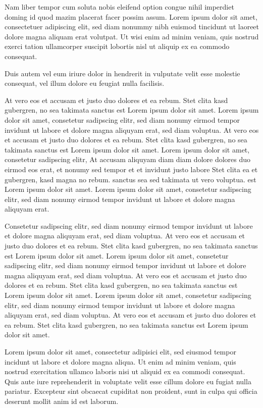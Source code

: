 \documentclass[twoside,a4paper]{article}
\begin{document}
Nam liber tempor cum soluta nobis eleifend option congue nihil imperdiet doming id quod mazim placerat facer possim assum. Lorem ipsum dolor sit amet, consectetuer adipiscing elit, sed diam nonummy nibh euismod tincidunt ut laoreet dolore magna aliquam erat volutpat. Ut wisi enim ad minim veniam, quis nostrud exerci tation ullamcorper suscipit lobortis nisl ut aliquip ex ea commodo consequat.

Duis autem vel eum iriure dolor in hendrerit in vulputate velit esse molestie consequat, vel illum dolore eu feugiat nulla facilisis.

At vero eos et accusam et justo duo dolores et ea rebum. Stet clita kasd gubergren, no sea takimata sanctus est Lorem ipsum dolor sit amet. Lorem ipsum dolor sit amet, consetetur sadipscing elitr, sed diam nonumy eirmod tempor invidunt ut labore et dolore magna aliquyam erat, sed diam voluptua. At vero eos et accusam et justo duo dolores et ea rebum. Stet clita kasd gubergren, no sea takimata sanctus est Lorem ipsum dolor sit amet. Lorem ipsum dolor sit amet, consetetur sadipscing elitr, At accusam aliquyam diam diam dolore dolores duo eirmod eos erat, et nonumy sed tempor et et invidunt justo labore Stet clita ea et gubergren, kasd magna no rebum. sanctus sea sed takimata ut vero voluptua. est Lorem ipsum dolor sit amet. Lorem ipsum dolor sit amet, consetetur sadipscing elitr, sed diam nonumy eirmod tempor invidunt ut labore et dolore magna aliquyam erat.

Consetetur sadipscing elitr, sed diam nonumy eirmod tempor invidunt ut labore et dolore magna aliquyam erat, sed diam voluptua. At vero eos et accusam et justo duo dolores et ea rebum. Stet clita kasd gubergren, no sea takimata sanctus est Lorem ipsum dolor sit amet. Lorem ipsum dolor sit amet, consetetur sadipscing elitr, sed diam nonumy eirmod tempor invidunt ut labore et dolore magna aliquyam erat, sed diam voluptua. At vero eos et accusam et justo duo dolores et ea rebum. Stet clita kasd gubergren, no sea takimata sanctus est Lorem ipsum dolor sit amet. Lorem ipsum dolor sit amet, consetetur sadipscing elitr, sed diam nonumy eirmod tempor invidunt ut labore et dolore magna aliquyam erat, sed diam voluptua. At vero eos et accusam et justo duo dolores et ea rebum. Stet clita kasd gubergren, no sea takimata sanctus est Lorem ipsum dolor sit amet.

Lorem ipsum dolor sit amet, consectetur adipisici elit, sed eiusmod tempor incidunt ut labore et dolore magna aliqua. Ut enim ad minim veniam, quis nostrud exercitation ullamco laboris nisi ut aliquid ex ea commodi consequat. Quis aute iure reprehenderit in voluptate velit esse cillum dolore eu fugiat nulla pariatur. Excepteur sint obcaecat cupiditat non proident, sunt in culpa qui officia deserunt mollit anim id est laborum.
\end{document}
